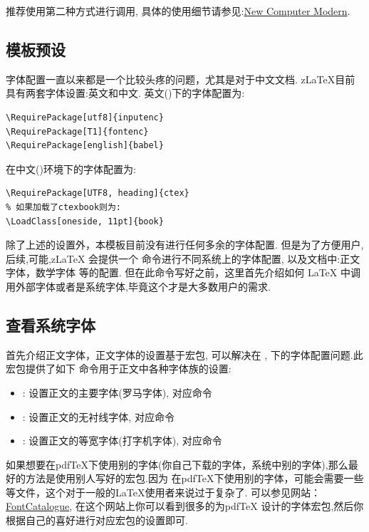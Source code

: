推荐使用第二种方式进行调用, 具体的使用细节请参见:\href{https://ctan.org/pkg/newcomputermodern}{New Computer Modern}.

\subsection{模板预设}
字体配置一直以来都是一个比较头疼的问题，尤其是对于中文文档. z\LaTeX{}目前具有两套字体设置:英文和中文.
英文()下的字体配置为:
\begin{verbatim}
\RequirePackage[utf8]{inputenc}
\RequirePackage[T1]{fontenc}
\RequirePackage[english]{babel} 
\end{verbatim}

在中文()环境下的字体配置为:
\begin{verbatim}
\RequirePackage[UTF8, heading]{ctex}
% 如果加载了ctexbook则为:
\LoadClass[oneside, 11pt]{book}
\end{verbatim}

除了上述的设置外，本模板目前没有进行任何多余的字体配置. 但是为了方便用户,后续,可能,z\LaTeX{} 会提供一个
\cmd{\zlatexFontSetup}\index{\cmd{\zlatexFontSetup}} 命令进行不同系统上的字体配置, 以及文档中:正文字体，数学字体
等的配置. 但在此命令写好之前，这里首先介绍如何 \LaTeX{} 中调用外部字体或者是系统字体,毕竟这个才是大多数用户的需求.

\subsection{查看系统字体}
首先介绍正文字体，正文字体的设置基于宏包, 可以解决在 , 下的字体配置问题.此宏包提供了如下
命令用于正文中各种字体族的设置\index{\cmd{\setmainfont}}\index{\cmd{\setsansfont}}\index{\cmd{\setmonofont}}:
\begin{itemize}
    \item \cmd{\setmainfont}: 设置正文的主要字体(罗马字体), 对应命令\cmd{\textrm}
    \item \cmd{\setsansfont}: 设置正文的无衬线字体, 对应命令\cmd{\textsf}
    \item \cmd{\setmonofont}: 设置正文的等宽字体(打字机字体), 对应命令\cmd{\texttt}
\end{itemize}

\begin{remark}
如果想要在pdf\TeX{}下使用别的字体(你自己下载的字体，系统中别的字体),那么最好的方法是使用别人写好的宏包.因为
在pdf\TeX{}下使用别的字体，可能会需要一些等文件，这个对于一般的\LaTeX{}使用者来说过于复杂了.
可以参见网站：\href{https://tug.org/FontCatalogue/allfonts.html}{FontCatalogue}, 在这个网站上你可以看到很多的为pdf\TeX{}
设计的字体宏包,然后你根据自己的喜好进行对应宏包的设置即可.
\end{remark}

